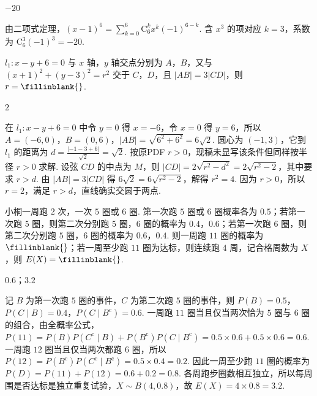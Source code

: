\begin{answer}
\(-20\)
\end{answer}

\begin{solution}
由二项式定理，\((x-1)^{6}=\sum_{k=0}^{6}\mathrm C_{6}^{k}x^{k}(-1)^{6-k}\). 含 \(x^{3}\) 的项对应 \(k=3\)，系数为 \(\mathrm C_{6}^{3}(-1)^{3}=-20\).
\end{solution}

\begin{problem}
\(l_1:x-y+6=0\) 与 \(x\) 轴，\(y\) 轴交点分别为 \(A\)，\(B\)，又与 \((x+1)^2+(y-3)^2=r^2\) 交于 \(C\)，\(D\)，且 \(|AB|=3|CD|\)，则 \(r=\fillinblank{}\).
\end{problem}

\begin{answer}
\(2\)
\end{answer}

\begin{solution}
在 \(l_{1}:x-y+6=0\) 中令 \(y=0\) 得 \(x=-6\)，令 \(x=0\) 得 \(y=6\)，所以 \(A=(-6,0)\)，\(B=(0,6)\)，\(|AB|=\sqrt{6^{2}+6^{2}}=6\sqrt{2}\). 圆心为 \((-1,3)\)，它到 \(l_{1}\) 的距离为 \(d=\frac{|-1-3+6|}{\sqrt{2}}=\sqrt{2}\). 按原PDF \(r>0\)，现稿未显写该条件但同样按半径 \(r>0\) 求解. 设弦 \(CD\) 的中点为 \(M\)，则 \(|CD|=2\sqrt{r^{2}-d^{2}}=2\sqrt{r^{2}-2}\)，其中要求 \(r>d\). 由 \(|AB|=3|CD|\) 得 \(6\sqrt{2}=6\sqrt{r^{2}-2}\)，解得 \(r^{2}=4\). 因为 \(r>0\)，所以 \(r=2\)，满足 \(r>d\)，直线确实交圆于两点.
\end{solution}

\begin{problem}
小桐一周跑 \(2\) 次，一次 \(5\) 圈或 \(6\) 圈. 第一次跑 \(5\) 圈或 \(6\) 圈概率各为 \(0.5\)；若第一次跑 \(5\) 圈，则第二次分别跑 \(5\) 圈，\(6\) 圈的概率为 \(0.4\)，\(0.6\)；若第一次跑 \(6\) 圈，则第二次分别跑 \(5\) 圈，\(6\) 圈的概率为 \(0.6\)，\(0.4\).
则一周跑 \(11\) 圈的概率为 \(\fillinblank{}\)；若一周至少跑 \(11\) 圈为达标，则连续跑 \(4\) 周，记合格周数为 \(X\)，则 \(E(X)=\fillinblank{}\).
\end{problem}

\begin{answer}
\(0.6\)；\(3.2\)
\end{answer}

\begin{solution}
记 \(B\) 为第一次跑 \(5\) 圈的事件，\(C\) 为第二次跑 \(5\) 圈的事件，则 \(P(B)=0.5\)，\(P(C\mid B)=0.4\)，\(P(C\mid B^{\mathrm c})=0.6\). 一周跑 \(11\) 圈当且仅当两次恰为 \(5\) 圈与 \(6\) 圈的组合，由全概率公式，\(P(11)=P(B)P(C^{\mathrm c}\mid B)+P(B^{\mathrm c})P(C\mid B^{\mathrm c})=0.5\times 0.6+0.5\times 0.6=0.6\). 一周跑 \(12\) 圈当且仅当两次都跑 \(6\) 圈，所以 \(P(12)=P(B^{\mathrm c})P(C^{\mathrm c}\mid B^{\mathrm c})=0.5\times 0.4=0.2\). 因此一周至少跑 \(11\) 圈的概率为 \(P(D)=P(11)+P(12)=0.6+0.2=0.8\). 各周跑步圈数相互独立，所以每周围是否达标是独立重复试验，\(X\sim B(4,0.8)\)，故 \(E(X)=4\times 0.8=3.2\).
\end{solution}

